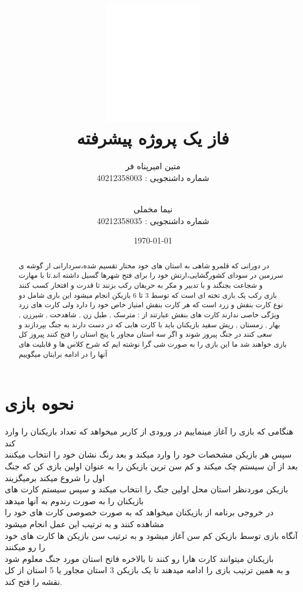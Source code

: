 \documentclass[pdf,titlepage,a4paper]{report}
\title{\includegraphics[scale=0.8]{Graphics/BASU_logo.png} \\ \Huge{فاز یک پروژه پیشرفته}}
\author{متین امیرپناه فر \\ شماره داشنجویی : 40212358003
		  \and \\ نیما مخملی \\ شماره داشنجویی : 40212358035}
\date{\today}
\begin{document}
	{\color{white}
	\maketitle}
	\tableofcontents
	\newpage

	\begin{abstract}
		
		در دورانی که قلمرو شاهی به استان های خود مختار تقسیم شده،سردارانی از گوشه ی سرزمین در سودای کشورگشایی،ارتش خود را برای فتح شهرها گسیل داشته اند.تا با مهارت و شجاعت بجنگند و با تدبیر و مکر به حریفان رکب بزنند تا قدرت و افتخار کسب کنند \\

     بازی رکب یک بازی تخته ای است که توسط 3 تا 6 بازیکن انجام میشود 
	 این بازی شامل دو نوع کارت بنفش و زرد است که هر کارت بنفش امتیاز خاص خود را دارد ولی کارت های زرد ویژگی خاصی ندارند
	 کارت های بنفش عبارتند از : مترسک , طبل زن , شاهدخت ,  شیرزن  ,  بهار  , زمستان , ریش سفید 
	 بازیکنان باید با کارت هایی که در دست دارند به جنگ بپردازند و سعی کنند در جنگ پیروز شوند و اگر سه استان مجاور یا پنج استان را فتح کنند پیروز کل بازی خواهند شد 
	 ما این بازی را به صورت شی گرا نوشته ایم که شرح کلاس ها و قابلیت های آنها را در ادامه برایتان میگوییم
	  
	\end{abstract}
    
	\newpage
    \part{نحوه بازی}
     هنگامی که بازی را آغاز مینماییم در ورودی از کاربر میخواهد که تعداد بازیکنان را وارد کند \\
     سپس هر بازیکن مشخصات خود را وارد میکند و بعد رنگ نشان خود را انتخاب میکنند \\
	 بعد از آن سیستم چک میکند و کم سن ترین بازیکن را به عنوان اولین بازی کن که جنگ اول را شروع میکند برمیگزیند\\
	 بازیکن موردنظر استان محل اولین جنگ را انتخاب میکند و سپس سیستم کارت های بازیکنان را به صورت رندوم به آنها میدهد \\
	 در خروجی برنامه از بازیکنان میخواهد که به صورت خصوصی کارت های خود را مشاهده کنند و به ترتیب این عمل انجام میشود\\
	 آنگاه بازی توسط بازیکن کم سن آغاز میشود و به ترتیب سن بازیکن ها کارت های خود را رو میکنند\\
	 بازیکنان میتوانند کارت هارا رو کنند تا بالاخره فاتح استان مورد جنگ معلوم شود\\
	 و به همین ترتیب بازی را ادامه میدهند تا یک بازیکن 3 استان مجاور یا 5 استان از کل نقشه را فتح کند.\\
	
\end{document}
